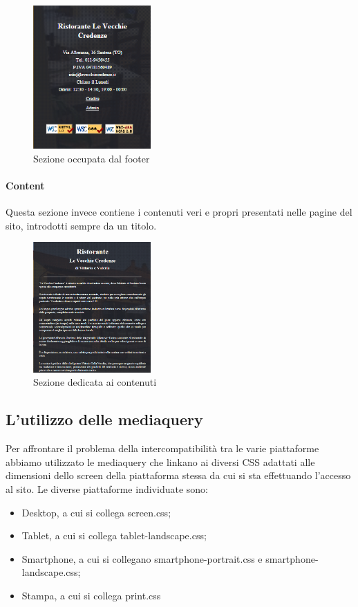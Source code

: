 \begin{figure}[H]
		\centering \includegraphics[width=0.4\textwidth]{images/footer.png}
		\caption{Sezione occupata dal footer}
\end{figure}

\paragraph{Content}

Questa sezione invece contiene i contenuti veri e propri presentati nelle pagine del sito, introdotti sempre da un titolo.

\begin{figure}[H]
		\centering \includegraphics[width=0.4\textwidth]{images/content.png}
		\caption{Sezione dedicata ai contenuti}
\end{figure}

\subsection{L’utilizzo delle mediaquery}

Per affrontare il problema della intercompatibilità tra le varie piattaforme abbiamo utilizzato le mediaquery che linkano ai diversi CSS adattati alle dimensioni dello screen della piattaforma stessa da cui si sta effettuando l’accesso al sito.
Le diverse piattaforme individuate sono:
\begin{itemize}
\item Desktop, a cui si collega screen.css;
\item Tablet, a cui si collega tablet-landscape.css;
\item Smartphone, a cui si collegano smartphone-portrait.css e smartphone-landscape.css;
\item Stampa, a cui si collega print.css
\end{itemize}

